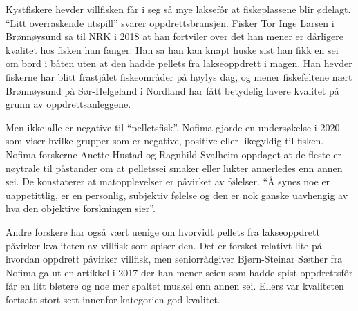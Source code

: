 Kystfiskere hevder villfisken får i seg så mye laksefôr at fiskeplassene blir ødelagt. ``Litt overraskende utspill'' svarer oppdrettsbransjen. Fisker Tor Inge Larsen i Brønnøysund sa til NRK i 2018 at han fortviler over det han mener er dårligere kvalitet hos fisken han fanger. Han sa han kan knapt huske sist han fikk en sei om bord i båten uten at den hadde pellets fra lakseoppdrett i magen. Han hevder fiskerne har blitt frastjålet fiskeområder på høylys dag, og mener fiskefeltene nært Brønnøysund på Sør-Helgeland i Nordland har fått betydelig lavere kvalitet på grunn av oppdrettsanleggene. \cite{Olsen m.fl. 2018}


Men ikke alle er negative til ``pelletsfisk''. Nofima gjorde en undersøkelse i 2020 som viser hvilke grupper som er negative, positive eller likegyldig til fisken. Nofima forskerne Anette Hustad og Ragnhild Svalheim oppdaget at de fleste er nøytrale til påstander om at pelletssei smaker eller lukter annerledes enn annen sei. De konstaterer at matopplevelser er påvirket av følelser. ``Å synes noe er uappetittlig, er en personlig, subjektiv følelse og den er nok ganske uavhengig av hva den objektive forskningen sier''. \cite{Hustad og Svalheim 2020}

Andre forskere har også vært uenige om hvorvidt pellets fra lakseoppdrett påvirker kvaliteten av villfisk som spiser den. Det er forsket relativt lite på hvordan oppdrett påvirker villfisk, men seniorrådgiver Bjørn-Steinar Sæther fra Nofima ga ut en artikkel i 2017 der han mener seien som hadde spist oppdrettsfôr får en litt bløtere og noe mer spaltet muskel enn annen sei. Ellers var kvaliteten fortsatt stort sett innenfor kategorien god kvalitet. \cite{Saether 2017}


